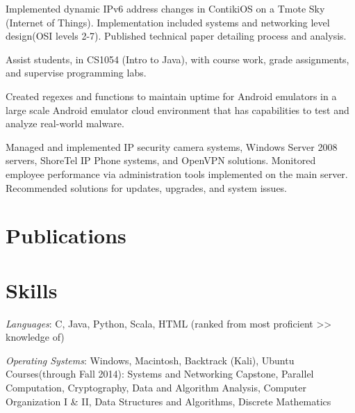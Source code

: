 \documentclass{tpreiss_cv}
\begin{document}

Implemented dynamic IPv6 address changes in ContikiOS on a Tmote Sky (Internet of Things). Implementation included systems and networking level design(OSI levels 2-7). Published technical paper detailing process and analysis. 


Assist students, in CS1054 (Intro to Java), with course work, grade assignments, and supervise programming labs.


Created regexes and functions to maintain uptime for Android emulators in a large scale Android emulator cloud environment that has capabilities to test and analyze real-world malware.


Managed and implemented IP security camera systems, Windows Server 2008 servers, ShoreTel IP Phone systems, and OpenVPN solutions. Monitored employee performance via administration tools implemented on    the main server. Recommended solutions for updates, upgrades, and system issues.

\section{Publications}

\section{Skills}
\textit{Languages}: C, Java, Python, Scala, HTML (ranked from most proficient >> knowledge of)

\textit{Operating Systems}: Windows, Macintosh, Backtrack (Kali), Ubuntu
Courses(through Fall 2014):    Systems and Networking Capstone, Parallel Computation, Cryptography, Data and Algorithm Analysis, Computer Organization I \& II, Data Structures and Algorithms, Discrete Mathematics
\end{document}
